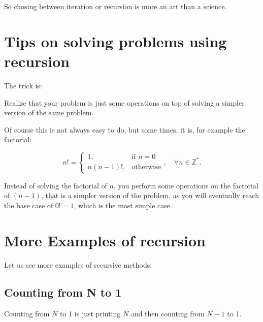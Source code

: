 \documentclass[a4paper, 9pt]{extarticle}
\begin{document}
So chosing between iteration or recursion is more an art than a science.





\section{Tips on solving problems using recursion}

The trick is:

\begin{blackboard}
Realize that your problem is just some operations on top of
solving a simpler version of the same problem.
\end{blackboard}

Of course this is not always easy to do, but some times, it is, for example the factorial:

\begin{equation*}
  n! =
  \begin{cases}
    1,              & \text{if } n = 0\\
    n(n-1)!,    & \text{otherwise}
  \end{cases}, \quad \forall n \in \mathbb{Z}^{*}.
\end{equation*}

Instead of solving the factorial of $n$, you perform some operations on the
factorial of $(n-1)$, that is a simpler version of the problem, as you will
eventually reach the base case of $0! = 1$, which is the most simple case.




\section{More Examples of recursion}

Let us see more examples of recursive methods:


\subsection{Counting from N to 1}

\begin{multicols}{2}
\columnbreak
\end{multicols}

Counting from $N$ to 1 is just printing $N$ and then counting from $N-1$ to 1.
\end{document}
